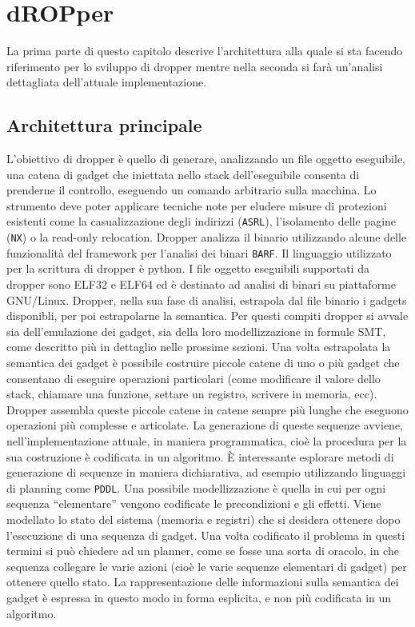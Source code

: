 \chapter{dROPper}

La prima parte di questo capitolo descrive l'architettura alla quale
si sta facendo riferimento per lo sviluppo di dropper mentre nella
seconda si farà un'analisi dettagliata dell'attuale implementazione.

\section{Architettura principale}

L'obiettivo di dropper è quello di generare, analizzando un file
oggetto eseguibile, una catena di gadget che iniettata nello stack
dell'eseguibile consenta di prenderne il controllo, eseguendo un
comando arbitrario sulla macchina. Lo strumento deve poter applicare
tecniche note per eludere misure di protezioni esistenti come la
casualizzazione degli indirizzi (\lstinline{ASRL}), l'isolamento delle
pagine (\lstinline{NX}) o la read-only relocation. Dropper analizza il
binario utilizzando alcune delle funzionalità del framework per
l'analisi dei binari \lstinline{BARF}. Il linguaggio utilizzato per la
scrittura di dropper è python. I file oggetto eseguibili supportati da
dropper sono ELF32 e ELF64 ed è destinato ad analisi di binari su
piattaforme GNU/Linux. Dropper, nella sua fase di analisi, estrapola
dal file binario i gadgets disponibli, per poi estrapolarne la
semantica. Per questi compiti dropper si avvale sia dell'emulazione
dei gadget, sia della loro modellizzazione in formule SMT, come
descritto più in dettaglio nelle prossime sezioni. Una volta
estrapolata la semantica dei gadget è possibile costruire piccole
catene di uno o più gadget che consentano di eseguire operazioni
particolari (come modificare il valore dello stack, chiamare una
funzione, settare un registro, scrivere in memoria, ecc). Dropper
assembla queste piccole catene in catene sempre più lunghe che
eseguono operazioni più complesse e articolate. La generazione di
queste sequenze avviene, nell'implementazione attuale, in maniera
programmatica, cioè la procedura per la sua costruzione è codificata
in un algoritmo. È interessante esplorare metodi di generazione di
sequenze in maniera dichiarativa, ad esempio utilizzando linguaggi di
planning come \lstinline{PDDL}\cite{pddl-97}. Una possibile
modellizzazione è quella in cui per ogni sequenza ``elementare''
vengono codificate le precondizioni e gli effetti. Viene modellato lo
stato del sistema (memoria e registri) che si desidera ottenere dopo
l'esecuzione di una sequenza di gadget. Una volta codificato il
problema in questi termini si può chiedere ad un planner, come se
fosse una sorta di oracolo, in che sequenza collegare le varie azioni
(cioè le varie sequenze elementari di gadget) per ottenere quello
stato. La rappresentazione delle informazioni sulla semantica dei
gadget è espressa in questo modo in forma esplicita, e non più
codificata in un algoritmo.

